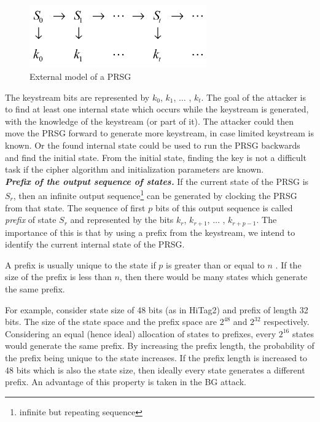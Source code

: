 \begin{figure}[h]
	\centering
	\includegraphics[width=3in]{./figures/prsgmodel.png}
	\caption{External model of a PRSG \cite{babbage}}	
	\label{fig:psrg-model}
\end{figure}

The keystream bits are represented by $k_0$, $k_1$, $\ldots$ , $k_{t}$. The goal of the attacker is to find at least one internal state which occurs while the keystream is generated, with the knowledge of the keystream (or part of it). The attacker could then move the PRSG forward to generate more keystream, in case limited keystream is known. Or the found internal state could be used to run the PRSG backwards and find the initial state. From the initial state, finding the key is not a difficult task if the cipher algorithm and initialization parameters are known. \\

\noindent \textit{\textbf{Prefix of the output sequence of states.}} If the current state of the PRSG is $S_r$, then an infinite output sequence\footnote{infinite but repeating sequence} can be generated by clocking the PRSG from that state. The sequence of first $p$ bits of this output sequence is called \textit{prefix} of state $S_r$ and represented by the bits $k_r$, $k_{r+1}$, $\ldots$ , $k_{r+p-1}$. The importance of this is that by using a prefix from the keystream, we intend to identify the current internal state of the PRSG.

A prefix is usually unique to the state if $p$ is greater than or equal to $n$ \cite{biryukov2000rtc}. If the size of the prefix is less than $n$, then there would be many states which generate the same prefix. 

For example, consider state size of 48 bits (as in HiTag2) and prefix of length 32 bits. The size of the state space and the prefix space are $2^{48}$ and $2^{32}$ respectively. Considering an equal (hence ideal) allocation of states to prefixes, every $2^{16}$ states would generate the same prefix. By increasing the prefix length, the probability of the prefix being unique to the state increases. If the prefix length is increased to 48 bits which is also the state size, then ideally every state generates a different prefix. An advantage of this property is taken in the BG attack. 

